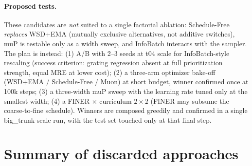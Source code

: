 \documentclass[11pt,a4paper]{article}
\begin{document}
\paragraph{Proposed tests.}
These candidates are \emph{not} suited to a single factorial ablation:
Schedule-Free \emph{replaces} WSD+EMA (mutually exclusive alternatives,
not additive switches), muP is testable only as a width sweep, and
InfoBatch interacts with the sampler. The plan is instead:
(1) A/B with 2--3 seeds at t04 scale for InfoBatch-style rescaling
(success criterion: grating regression absent at full prioritization
strength, equal MRE at lower cost);
(2) a three-arm optimizer bake-off (WSD+EMA / Schedule-Free / Muon) at
short budget, winner confirmed once at 100k steps;
(3) a three-width muP sweep with the learning rate tuned only at the
smallest width;
(4) a FINER $\times$ curriculum $2\times2$ (FINER may subsume the
coarse-to-fine schedule). Winners are composed greedily and confirmed
in a single big\_trunk-scale run, with the test set touched only at
that final step.

\section{Summary of discarded approaches}
\label{sec:discarded}
\end{document}
